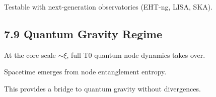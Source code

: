 	Testable with next-generation observatories (EHT-ng, LISA, SKA).
	
	\subsection{7.9 Quantum Gravity Regime}
	
	At the core scale $\sim \xi$, full T0 quantum node dynamics takes over.
	
	Spacetime emerges from node entanglement entropy.
	
	This provides a bridge to quantum gravity without divergences.
	